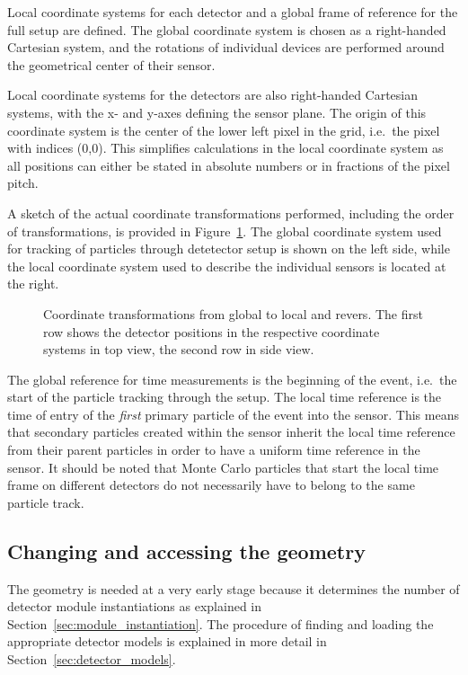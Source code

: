Local coordinate systems for each detector and a global frame of reference for the full setup are defined.
The global coordinate system is chosen as a right-handed Cartesian system, and the rotations of individual devices are performed around the geometrical center of their sensor.

Local coordinate systems for the detectors are also right-handed Cartesian systems, with the x- and y-axes defining the sensor plane.
The origin of this coordinate system is the center of the lower left pixel in the grid, i.e.\ the pixel with indices (0,0).
This simplifies calculations in the local coordinate system as all positions can either be stated in absolute numbers or in fractions of the pixel pitch.

A sketch of the actual coordinate transformations performed, including the order of transformations, is provided in Figure~\ref{fig:transformations}. The global coordinate system used for tracking of particles through detetector setup is shown on the left side, while the local coordinate system used to describe the individual sensors is located at the right.

\begin{figure}[tbp]
  \center
  
  \caption{Coordinate transformations from global to local and revers. The first row shows the detector positions in the respective coordinate systems in top view, the second row in side view.}
  \label{fig:transformations}
\end{figure}

The global reference for time measurements is the beginning of the event, i.e.\ the start of the particle tracking through the setup.
The local time reference is the time of entry of the \emph{first} primary particle of the event into the sensor.
This means that secondary particles created within the sensor inherit the local time reference from their parent particles in order to have a uniform time reference in the sensor.
It should be noted that Monte Carlo particles that start the local time frame on different detectors do not necessarily have to belong to the same particle track.

\subsection{Changing and accessing the geometry}
The geometry is needed at a very early stage because it determines the number of detector module instantiations as explained in Section~\ref{sec:module_instantiation}.
The procedure of finding and loading the appropriate detector models is explained in more detail in Section~\ref{sec:detector_models}.

